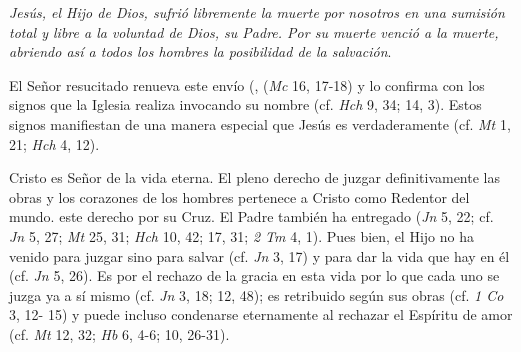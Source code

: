 \begin{ccebody}

 \textit{Jesús, el Hijo de Dios, sufrió libremente la muerte por nosotros en una sumisión total y libre a la voluntad de Dios, su Padre. Por su muerte venció a la muerte, abriendo así a todos los hombres la posibilidad de la salvación}.

 El Señor resucitado renueva este envío (, (\textit{Mc} 16, 17-18) y lo confirma con los signos que la Iglesia realiza invocando su nombre (cf. \textit{Hch} 9, 34; 14, 3). Estos signos manifiestan de una manera especial que Jesús es verdaderamente  (cf. \textit{Mt} 1, 21; \textit{Hch} 4, 12).
\end{ccebody}


\begin{ccebody}
 Cristo es Señor de la vida eterna. El pleno derecho de juzgar definitivamente las obras y los corazones de los hombres pertenece a Cristo como Redentor del mundo.  este derecho por su Cruz. El Padre también ha entregado  (\textit{Jn} 5, 22; cf. \textit{Jn} 5, 27; \textit{Mt} 25, 31; \textit{Hch} 10, 42; 17, 31; \textit{2 Tm} 4, 1). Pues bien, el Hijo no ha venido para juzgar sino para salvar (cf. \textit{Jn} 3, 17) y para dar la vida que hay en él (cf. \textit{Jn} 5, 26). Es por el rechazo de la gracia en esta vida por lo que cada uno se juzga ya a sí mismo (cf. \textit{Jn} 3, 18; 12, 48); es retribuido según sus obras (cf. \textit{1 Co} 3, 12- 15) y puede incluso condenarse eternamente al rechazar el Espíritu de amor (cf. \textit{Mt} 12, 32; \textit{Hb} 6, 4-6; 10, 26-31).
\end{ccebody}

